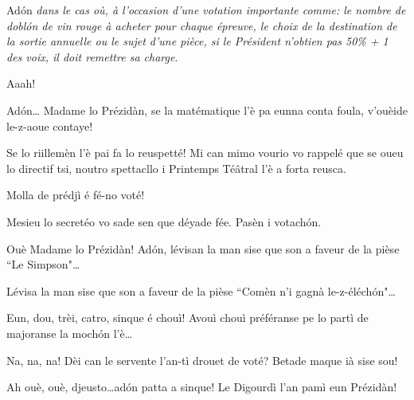\begin{drama}
\Secreteospeaks Ad\'on \og\textit{dans le cas où, à l’occasion d’une votation importante comme: le nombre de \og dobl\'on \fg de vin rouge à acheter pour chaque épreuve, le choix de la destination de la sortie annuelle ou le sujet d’une pièce, si le Président n’obtien pas 50\% + 1 des voix, il doit remettre sa charge}\fg.

\Sophiespeaks Aaah! 


\Jordyspeaks Ad\'on\ldots {} Madame lo Prézidàn, se la matématique l'è pa eunna conta foula, v'ouèide le-z-aoue contaye!

\Presidanspeaks {} Se lo riillemèn l'è pai fa lo reuspetté! Mi can mimo vourio vo rappelé que se oueu lo directif tsi, noutro spettacllo i Printemps Té\^atral l'è a forta reusca.

\Marcospeaks Molla de prédjì é fé-no voté!

\Presidanspeaks Mesieu lo secretéo vo sade sen que déyade fée. Pasèn i votach\'on.

\Secreteospeaks Ouè Madame lo Prézidàn! Ad\'on, lévisan la man sise que son a faveur de la pièse ``Le Simpson"\ldots


\Secreteospeaks Lévisa la man sise que son a faveur de la pièse ``Comèn n'i gagnà le-z-éléch\'on"\ldots


\Secreteospeaks Eun, dou, trèi, catro, sinque  é chouì! Avouì chouì préféranse pe lo partì de majoranse la moch\'on l’è\ldots

\Sophiespeaks {}
Na, na, na! Dèi can le servente l'an-tì drouet de
voté?  Betade maque ià sise sou!

\Secreteospeaks  {} Ah ouè, ouè, djeusto\ldots ad\'on patta a sinque! Le Digourdì l’an pamì eun Prézidàn!


\end{drama}
